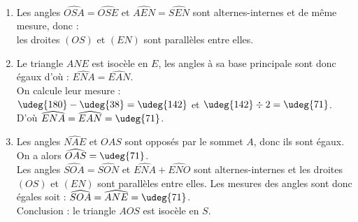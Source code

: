   \ \\ [-5mm]
   \begin{enumerate}
      \item Les angles $\widehat{OSA} =\widehat{OSE}$ et $\widehat{AEN} =\widehat{SEN}$ sont alternes-internes et de même mesure,  donc : \\
         {\blue les droites $(OS)$ et $(EN)$ sont parallèles entre elles}.
      \item Le triangle $ANE$ est isocèle en $E$, les angles à sa base principale sont donc égaux d'où : {\blue $\widehat{ENA} =\widehat{EAN}$}. \\
         On calcule leur mesure : \\
         $\udeg{180}-\udeg{38} =\udeg{142}$ et $\udeg{142}\div2 =\udeg{71}$. \\
         D'où {\blue $\widehat{ENA} =\widehat{EAN} =\udeg{71}$}.
      \item Les angles $\widehat{NAE}$ et $\widehat{OAS}$ sont opposés par le sommet $A$, donc ils sont égaux.\\
         On a alors $\widehat{OAS} =\udeg{71}$. \\
         Les angles $\widehat{SOA} =\widehat{SON}$ et $\widehat{ENA}+\widehat{ENO}$ sont alternes-internes et les droites $(OS)$ et $(EN)$ sont parallèles entre elles. Les mesures des angles sont donc égales soit : $\widehat{SOA} =\widehat{ANE} =\udeg{71}$. \\
        Conclusion : {\blue le triangle $AOS$ est isocèle en $S$}.
   \end{enumerate}
